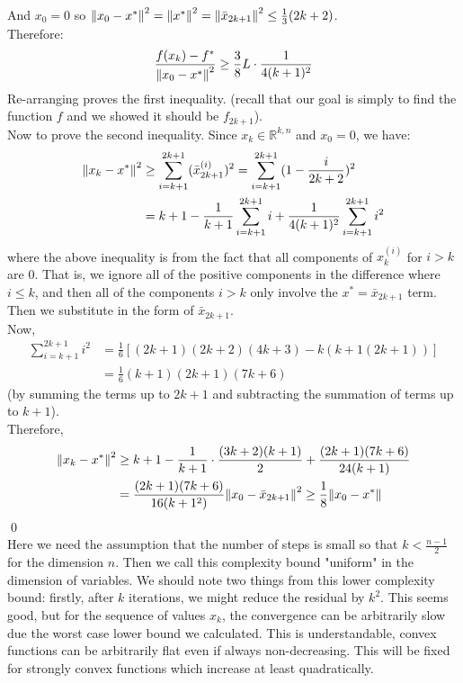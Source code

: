 \documentclass[12pt,a4paper]{article}
\begin{document}
	 And $x_0 = 0$ so $\norm{x_0 - x^*}^2 = \norm{x^*}^2 = \norm{\bar{x}_{2k+1}}^2 \leq \frac{1}{3}(2k+2)$. \\
	 Therefore:
	 \begin{align*}
	 	\frac{f(x_k) - f^*}{\norm{x_0 - x^*}^2} \geq \frac{3}{8}L \cdot \frac{1}{4(k+1)^2}
	 \end{align*}
	 Re-arranging proves the first inequality. (recall that our goal is simply to find the function $f$ and we showed it should be $f_{2k+1}$).\\
	 Now to prove the second inequality. Since $x_k \in \mathbb{R}^{k,n}$ and $x_0 = 0$, we have:
	 \begin{align*}
	 	\norm{x_k - x^*}^2 &\geq \sum_{i=k+1}^{2k+1}(\bar{x}_{2k+1}^{(i)})^2 = \sum_{i=k+1}^{2k+1}(1 - \frac{i}{2k+2})^2 \\
	 	&= k+1 - \frac{1}{k+1}\sum_{i=k+1}^{2k+1}i + \frac{1}{4(k+1)^2}\sum_{i=k+1}^{2k+1}i^2
	 \end{align*} 
	 where the above inequality is from the fact that all components of $x_k^{(i)}$ for $i > k$ are $0$. That is, we ignore all of the positive components in the difference where $i \leq k$, and then all of the components $i>k$ only involve the $x^* = \bar{x}_{2k+1}$ term. Then we substitute in the form of $\bar{x}_{2k+1}$.\\
	 Now,
	 \begin{align*}
	 	\sum_{i=k+1}^{2k+1}i^2 &= \frac{1}{6}[(2k+1)(2k+2)(4k+3) - k(k+1(2k+1))]\\
	 	&= \frac{1}{6}(k+1)(2k+1)(7k+6)
	 \end{align*}
	 (by summing the terms up to $2k+1$ and subtracting the summation of terms up to $k+1$).\\
	 Therefore,
	 \begin{align*}
	 	\norm{x_k - x^*}^2 &\geq k+1 - \frac{1}{k+1}\cdot \frac{(3k+2)(k+1)}{2} + \frac{(2k+1)(7k+6)}{24(k+1)}\\
	 	&= \frac{(2k+1)(7k+6)}{16(k+1^2)}\norm{x_0 - \bar{x}_{2k+1}}^2 \geq \frac{1}{8}\norm{x_0 - x^*}
	 \end{align*}
	 \qed \\
	 Here we need the assumption that the number of steps is small so that $k < \frac{n-1}{2}$ for the dimension $n$. Then we call this complexity bound "uniform" in the dimension of variables. We should note two things from this lower complexity bound: firstly, after $k$ iterations, we might reduce the residual by $k^2$. This seems good, but for the sequence of values $x_k$, the convergence can be arbitrarily slow due the worst case lower bound we calculated. This is understandable, convex functions can be arbitrarily flat even if always non-decreasing. This will be fixed for strongly convex functions which increase at least quadratically. 
\end{document}
